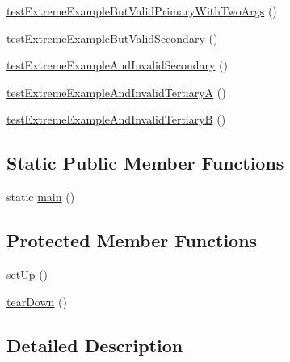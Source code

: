 \begin{DoxyCompactItemize}
\item 
\hyperlink{classtests__php_documentor_setup_clean_converter_name_piece_tests_aff588c9578db4c2f280aa26a269b89b5}{test\-Extreme\-Example\-But\-Valid\-Primary\-With\-Two\-Args} ()
\item 
\hyperlink{classtests__php_documentor_setup_clean_converter_name_piece_tests_a66669b136c6ad3b362fcb2c7366a2a15}{test\-Extreme\-Example\-But\-Valid\-Secondary} ()
\item 
\hyperlink{classtests__php_documentor_setup_clean_converter_name_piece_tests_a75c998a7215d2f7cca2b100e2f5f4231}{test\-Extreme\-Example\-And\-Invalid\-Secondary} ()
\item 
\hyperlink{classtests__php_documentor_setup_clean_converter_name_piece_tests_a87bc6259056256585b25e623f40d30cd}{test\-Extreme\-Example\-And\-Invalid\-Tertiary\-A} ()
\item 
\hyperlink{classtests__php_documentor_setup_clean_converter_name_piece_tests_acbc0316ec1dd030d197595f62f3b96e0}{test\-Extreme\-Example\-And\-Invalid\-Tertiary\-B} ()
\end{DoxyCompactItemize}
\subsection*{\-Static \-Public \-Member \-Functions}
\begin{DoxyCompactItemize}
\item 
static \hyperlink{classtests__php_documentor_setup_clean_converter_name_piece_tests_a36f43c36e6b3288e6bfb8244ce59073e}{main} ()
\end{DoxyCompactItemize}
\subsection*{\-Protected \-Member \-Functions}
\begin{DoxyCompactItemize}
\item 
\hyperlink{classtests__php_documentor_setup_clean_converter_name_piece_tests_a0bc688732d2b3b162ffebaf7812e78da}{set\-Up} ()
\item 
\hyperlink{classtests__php_documentor_setup_clean_converter_name_piece_tests_a80fe3d17e658907fc75346a0ec9d6fc7}{tear\-Down} ()
\end{DoxyCompactItemize}


\subsection{\-Detailed \-Description}


